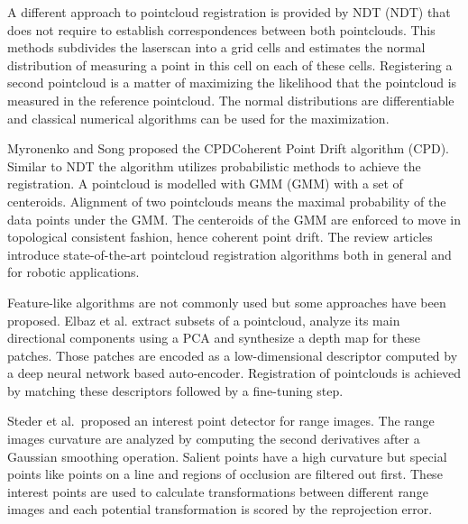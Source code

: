 A different approach to pointcloud registration is provided by \acrlong{NDT} (\acrshort{NDT})\cite{biber_iros2003} that does not require to establish correspondences between both pointclouds.
This methods subdivides the laserscan into a grid cells and estimates the normal distribution of measuring a point in this cell on each of these cells.
Registering a second pointcloud is a matter of maximizing the likelihood that the pointcloud is measured in the reference pointcloud.
The normal distributions are differentiable and classical numerical algorithms can be used for the maximization.

Myronenko and Song proposed the \acrlong{CPD}{Coherent Point Drift} algorithm (\acrshort{CPD})\cite{myronenko_ieee2010}.
Similar to \acrshort{NDT} the algorithm utilizes probabilistic methods to achieve the registration.
A pointcloud is modelled with \acrlong{GMM} (\acrshort{GMM}) with a set of centeroids.
Alignment of two pointclouds means the maximal probability of the data points under the \acrshort{GMM}.
The centeroids of the \acrshort{GMM} are enforced to move in topological consistent fashion, hence coherent point drift.
The review articles~\cite{bellekens_ambient2014,pomerleau_2015} introduce state-of-the-art pointcloud registration algorithms both in general and for robotic applications.

Feature-like algorithms are not commonly used but some approaches have been proposed.
Elbaz et al.\cite{elbaz_cvpr2017} extract subsets of a pointcloud, analyze its main directional components using a \acrlong{PCA} and synthesize a depth map for these patches.
Those patches are encoded as a low-dimensional descriptor computed by a deep neural network based auto-encoder.
Registration of pointclouds is achieved by matching these descriptors followed by a fine-tuning step.

Steder et al.~proposed\cite{steder_robot2010} an interest point detector for range images.
The range images curvature are analyzed by computing the second derivatives after a Gaussian smoothing operation.
Salient points have a high curvature but special points like points on a line and regions of occlusion are filtered out first.
These interest points are used to calculate transformations between different range images and each potential transformation is scored by the reprojection error.


